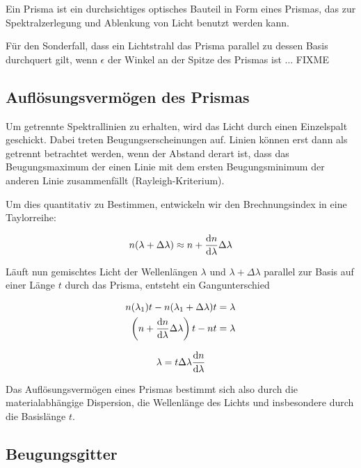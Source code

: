 \documentclass[a4paper,german,12pt,smallheadings]{scrartcl}
\begin{document}
Ein Prisma ist ein durchsichtiges optisches Bauteil in Form eines Prismas, das
zur Spektralzerlegung und Ablenkung von Licht benutzt werden kann.

Für den Sonderfall, dass ein Lichtstrahl das Prisma parallel zu dessen Basis
durchquert gilt, wenn $\epsilon$ der Winkel an der Spitze des Prismas ist ... FIXME

\subsection{Auflösungsvermögen des Prismas}

Um getrennte Spektrallinien zu erhalten, wird das Licht durch einen Einzelspalt
geschickt. Dabei treten Beugungserscheinungen auf. Linien können erst dann als
getrennt betrachtet werden, wenn der Abstand derart ist, dass das
Beugungsmaximum der einen Linie mit dem ersten Beugungsminimum der anderen
Linie zusammenfällt (Rayleigh-Kriterium).

Um dies quantitativ zu Bestimmen, entwickeln wir den Brechnungsindex in eine
Taylorreihe:

\begin{equation}
  n(\lambda + \Delta \lambda) \approx n + \frac{\dif n}{\dif \lambda} \Delta \lambda
\end{equation}

Läuft nun gemischtes Licht der Wellenlängen $\lambda$ und $\lambda + \Delta
\lambda$ parallel zur Basis auf einer Länge $t$ durch das Prisma, entsteht ein
Gangunterschied

\begin{align}
  n(\lambda_1) t - n(\lambda_1 + \Delta \lambda) t &= \lambda \\
  \del{ n + \frac{\dif n}{\dif \lambda} \Delta \lambda}t - nt &= \lambda
\end{align}

\begin{equation}
  \lambda = t \Delta \lambda \frac{\dif n}{\dif \lambda}
\end{equation}

Das Auflösungsvermögen eines Prismas bestimmt sich also durch die
materialabhängige Dispersion, die Wellenlänge des Lichts und insbesondere durch
die Basislänge $t$.

\subsection{Beugungsgitter}
\end{document}
